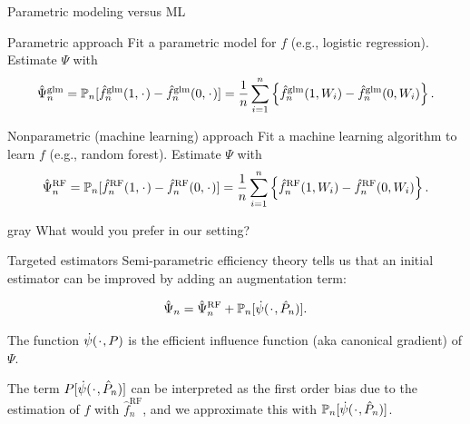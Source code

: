 \documentclass[smaller]{beamer}\usepackage{listings}
\newcommand{\blank}{\makebox[1ex]{\textbf{$\cdot$}}}
\newcommand{\1}{\mathds{1}}
\newcommand{\empmeas}{\ensuremath{\mathbb{P}_n}} %
\begin{document}
\begin{frame}[label={sec:orga28d02d}]{Parametric modeling versus ML}
\small
\begin{block}{Parametric approach}
Fit a parametric model for \( f \) (e.g., logistic regression). Estimate
$\Psi$ with
\begin{equation*}
  \hat{\Psi}_n^{\text{glm}} =\empmeas{[\hat{f}_n^{\text{glm}}(1, \blank)- \hat{f}_n^{\text{glm}}(0,
    \blank)]}
  = \frac{1}{n}\sum_{i=1}^{n}
  \left\{
    \hat{f}_n^{\text{glm}}(1, W_i) - \hat{f}_n^{\text{glm}}(0, W_i)
  \right\}.
\end{equation*}
\end{block}


\begin{block}{Nonparametric (machine learning) approach}
Fit a machine learning algorithm to learn \( f \) (e.g., random forest).
Estimate $\Psi$ with
\begin{equation*}
  \hat{\Psi}_n^{\text{RF}} = \empmeas{[\hat{f}_n^{\text{RF}}(1, \blank)- \hat{f}_n^{\text{RF}}(0,
    \blank)]}
  = \frac{1}{n}\sum_{i=1}^{n}
  \left\{
    \hat{f}_n^{\text{RF}}(1, W_i) - \hat{f}_n^{\text{RF}}(0, W_i)
  \right\}.
\end{equation*}

\vspace{.4cm}


\begin{beamercolorbox}[rounded=true]{gray}
\centering \normalsize What would you prefer in our setting?
\end{beamercolorbox}
\end{block}
\end{frame}

\begin{frame}[label={sec:org612a8a7}]{Targeted estimators}
Semi-parametric efficiency theory tells us that an initial estimator can be
improved by adding an augmentation term:

\begin{equation*}
  \hat{\Psi}_n = \hat{\Psi}_n^{\text{RF}} + \empmeas{[\dot{\psi}(\blank, \hat{P}_n)]}.
\end{equation*}

\vfill

The function \(\dot{\psi}(\blank, P)\) is the \color{bblue}efficient influence
function \color{black} (aka \color{bblue}canonical gradient\color{black}) of
\(\Psi\).

\vfill

The term \(P{[\dot{\psi}(\blank, \hat{P}_n)]}\) can be interpreted as the
first order bias due to the estimation of \(f\) with \(\hat{f}_n^{\text{RF}}\), and we approximate this with \(\empmeas{[\dot{\psi}(\blank, \hat{P}_n)]}\).
\end{frame}
\end{document}
